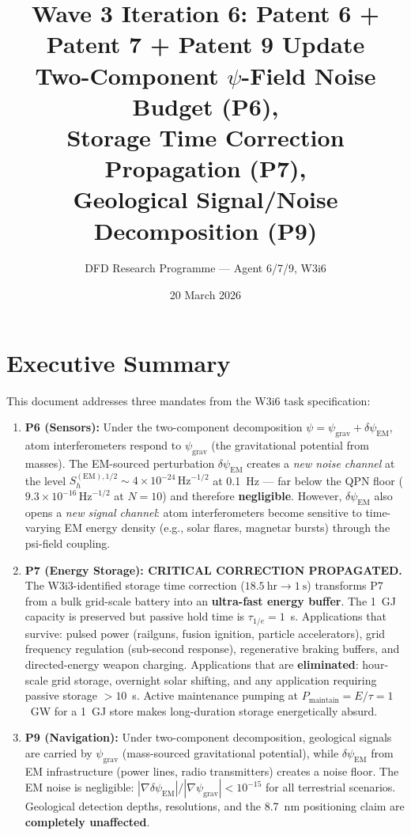 \documentclass[11pt]{article}
\title{\textbf{Wave 3 Iteration 6: Patent 6 + Patent 7 + Patent 9 Update}\\[6pt]
Two-Component $\psi$-Field Noise Budget (P6),\\
Storage Time Correction Propagation (P7),\\
Geological Signal/Noise Decomposition (P9)}
\author{DFD Research Programme --- Agent 6/7/9, W3i6}
\date{20 March 2026}
\theoremstyle{definition}
\theoremstyle{remark}
\newcommand{\ee}[1]{\times10^{#1}}
\newcommand{\sqrtHz}{\,\mathrm{Hz}^{-1/2}}
\newcommand{\psigrav}{\psi_{\mathrm{grav}}}
\newcommand{\dpsiem}{\delta\psi_{\mathrm{EM}}}
\begin{document}
\maketitle
\tableofcontents
\newpage

\section*{Executive Summary}

This document addresses three mandates from the W3i6 task specification:

\begin{enumerate}
\item \textbf{P6 (Sensors):} Under the two-component decomposition
  $\psi = \psigrav + \dpsiem$, atom interferometers respond to
  $\psigrav$ (the gravitational potential from masses). The EM-sourced
  perturbation $\dpsiem$ creates a \emph{new noise channel} at the
  level $S_h^{(\mathrm{EM}),1/2} \sim 4\ee{-24}\sqrtHz$ at 0.1~Hz ---
  far below the QPN floor ($9.3\ee{-16}\sqrtHz$ at $N=10$) and therefore
  \textbf{negligible}. However, $\dpsiem$ also opens a \emph{new signal
  channel}: atom interferometers become sensitive to time-varying EM
  energy density (e.g., solar flares, magnetar bursts) through the
  psi-field coupling.

\item \textbf{P7 (Energy Storage): CRITICAL CORRECTION PROPAGATED.}
  The W3i3-identified storage time correction ($18.5~\mathrm{hr} \to 1~\mathrm{s}$)
  transforms P7 from a bulk grid-scale battery into an \textbf{ultra-fast
  energy buffer}. The 1~GJ capacity is preserved but passive hold time is
  $\tau_{1/e} = 1$~s. Applications that survive: pulsed power (railguns,
  fusion ignition, particle accelerators), grid frequency regulation
  (sub-second response), regenerative braking buffers, and directed-energy
  weapon charging. Applications that are \textbf{eliminated}: hour-scale
  grid storage, overnight solar shifting, and any application requiring
  passive storage $> 10$~s. Active maintenance pumping at
  $P_{\mathrm{maintain}} = E/\tau = 1$~GW for a 1~GJ store makes
  long-duration storage energetically absurd.

\item \textbf{P9 (Navigation):} Under two-component decomposition,
  geological signals are carried by $\psigrav$ (mass-sourced gravitational
  potential), while $\dpsiem$ from EM infrastructure (power lines, radio
  transmitters) creates a noise floor. The EM noise is negligible:
  $|\nabla\dpsiem|/|\nabla\psigrav| < 10^{-15}$ for all terrestrial
  scenarios. Geological detection depths, resolutions, and the 8.7~nm
  positioning claim are \textbf{completely unaffected}.
\end{enumerate}
\end{document}
